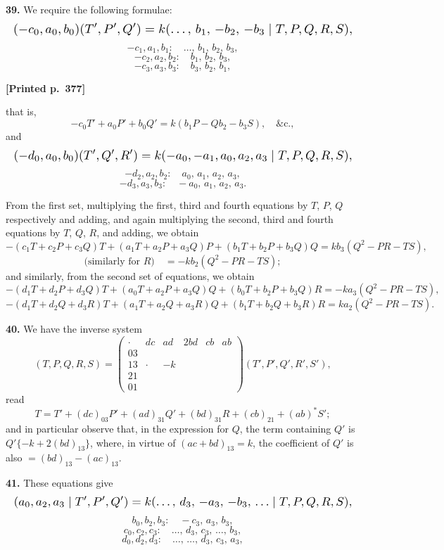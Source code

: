 \documentclass[11pt]{article}
\begin{document}
\medskip
\noindent\textbf{39.} We require the following formulae:
\[
\resizebox{\textwidth}{!}{$\displaystyle
(-c_{0},a_{0},b_{0})(T',P',Q')=k(\ldots,\,b_{1},\,-b_{2},\,-b_{3}\mid T,P,Q,R,S),
$}
\]
\[
-c_{1},a_{1},b_{1}:\quad\ldots,\,b_{1},\,b_{2},\,b_{3},
\]
\[
-c_{2},a_{2},b_{2}:\quad b_{1},\,b_{2},\,b_{3},
\]
\[
-c_{3},a_{3},b_{3}:\quad b_{3},\,b_{2},\,b_{1},
\]

\medskip
\noindent\textbf{[Printed p.~377]}\hfill

\medskip
that is,
\[
-c_{0}T'+a_{0}P'+b_{0}Q'=k(b_{1}P-Q b_{2}-b_{3}S),\quad\&\mathrm{c.},
\]
and
\[
\resizebox{\textwidth}{!}{$\displaystyle
(-d_{0},a_{0},b_{0})(T',Q',R')=k(-a_{0},-a_{1},a_{0},a_{2},a_{3}\mid T,P,Q,R,S),
$}
\]
\[
-d_{2},a_{2},b_{2}:\quad a_{0},\,a_{1},\,a_{2},\,a_{3},
\]
\[
-d_{3},a_{3},b_{3}:\quad -a_{0},\,a_{1},\,a_{2},\,a_{3}.
\]

From the first set, multiplying the first, third and fourth equations by $T$, $P$, $Q$ respectively and adding, and again multiplying the second, third and fourth equations by $T$, $Q$, $R$, and adding, we obtain
\[
-(c_{1}T+c_{2}P+c_{3}Q)T+(a_{1}T+a_{2}P+a_{3}Q)P+(b_{1}T+b_{2}P+b_{3}Q)Q=kb_{3}(Q^{2}-PR-TS),
\]
\[
\text{(similarly for }R\text{)}\quad=-kb_{2}(Q^{2}-PR-TS);
\]
and similarly, from the second set of equations, we obtain
\[
-(d_{1}T+d_{2}P+d_{3}Q)T+(a_{0}T+a_{2}P+a_{3}Q)Q+(b_{0}T+b_{2}P+b_{3}Q)R=-ka_{3}(Q^{2}-PR-TS),
\]
\[
-(d_{1}T+d_{2}Q+d_{3}R)T+(a_{1}T+a_{2}Q+a_{3}R)Q+(b_{1}T+b_{2}Q+b_{3}R)R=ka_{2}(Q^{2}-PR-TS).
\]

\medskip
\noindent\textbf{40.} We have the inverse system
\[
(T,P,Q,R,S)=\begin{pmatrix}
\cdot & dc & ad & 2bd & cb & ab\\
03 & & & & & \\
13 & \cdot & -k & & & \\
21 & & & & & \\
01 & & & & &
\end{pmatrix}(T',P',Q',R',S'),
\]
read
\[
T=T'+(dc)_{03}P'+(ad)_{31}Q'+(bd)_{31}R+(cb)_{21}+(ab)^{*}S';
\]
and in particular observe that, in the expression for $Q$, the term containing $Q'$ is $Q'\{-k+2(bd)_{13}\}$, where, in virtue of $(ac+bd)_{13}=k$, the coefficient of $Q'$ is also $=(bd)_{13}-(ac)_{13}$.

\medskip
\noindent\textbf{41.} These equations give
\[
\resizebox{\textwidth}{!}{$\displaystyle
(a_{0},a_{2},a_{3}\mid T',P',Q')=k(\ldots,\,d_{3},\,-a_{3},\,-b_{3},\,\ldots\mid T,P,Q,R,S),
$}
\]
\[
b_{0},b_{2},b_{3}:\quad -c_{3},\,a_{3},\,b_{3},
\]
\[
c_{0},c_{2},c_{3}:\quad \ldots,\,d_{3},\,c_{3},\,\ldots,\,b_{3},
\]
\[
d_{0},d_{2},d_{3}:\quad \ldots,\,\ldots,\,d_{3},\,c_{3},\,a_{3},
\]
\end{document}
